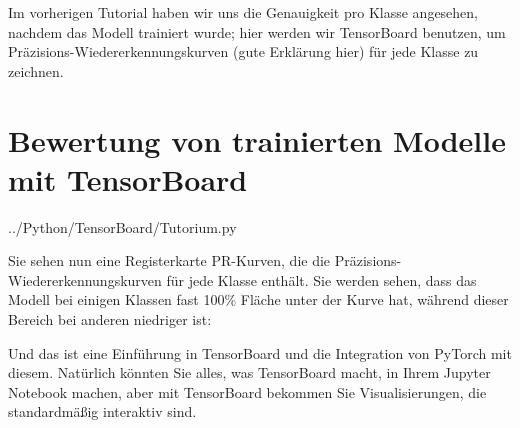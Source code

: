 
Im vorherigen Tutorial haben wir uns die Genauigkeit pro Klasse angesehen, nachdem das Modell trainiert wurde; hier werden wir TensorBoard benutzen, um Präzisions-Wiedererkennungskurven (gute Erklärung hier) für jede Klasse zu zeichnen.

\section{Bewertung von trainierten Modelle mit TensorBoard}


{../Python/TensorBoard/Tutorium.py}

Sie sehen nun eine Registerkarte \glqq PR-Kurven\glqq{}, die die Präzisions-Wiedererkennungskurven für jede Klasse enthält. Sie werden sehen, dass das Modell bei einigen Klassen fast 100\% \glqq Fläche unter der Kurve\grqq{} hat, während dieser Bereich bei anderen niedriger ist:


Und das ist eine Einführung in TensorBoard und die Integration von PyTorch mit diesem. Natürlich könnten Sie alles, was TensorBoard macht, in Ihrem Jupyter Notebook machen, aber mit TensorBoard bekommen Sie Visualisierungen, die standardmäßig interaktiv sind.
